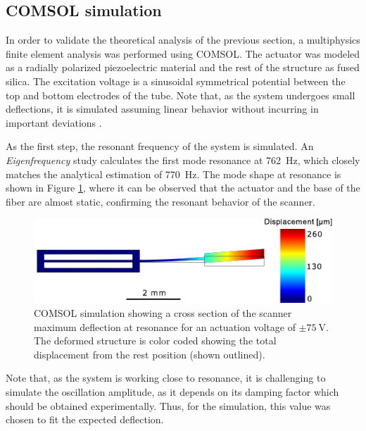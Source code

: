 \documentclass[10pt]{iopart}
\begin{document}
\subsection{COMSOL simulation}

In order to validate the theoretical analysis of the previous section, a multiphysics finite element analysis was performed using COMSOL. The actuator was modeled as a radially polarized piezoelectric material and the rest of the structure as fused silica. The excitation voltage is a sinusoidal symmetrical potential between the top and bottom electrodes of the tube. Note that, as the system undergoes small deflections, it is simulated assuming linear behavior without incurring in important deviations \cite{Fertis2006}.

As the first step, the resonant frequency of the system is simulated. An \textit{Eigenfrequency} study calculates the first mode resonance at \SI{762}{\hertz}, which closely matches the analytical estimation of \SI{770}{\hertz}. The mode shape at resonance is shown in Figure \ref{fig:defle}, where it can be observed that the actuator and the base of the fiber are almost static, confirming the resonant behavior of the scanner.

\begin{figure}[h!]\centering
      \includegraphics[width=\columnwidth]{figures/deflection.pdf}
      \caption{COMSOL simulation showing a cross section of the scanner maximum deflection at resonance for an actuation voltage of $\pm \SI{75}{\volt}$. The deformed structure is color coded showing the total displacement from the rest position (shown outlined). }
      \label{fig:defle}
\end{figure}

Note that, as the system is working close to resonance, it is challenging to simulate the oscillation amplitude, as it depends on its damping factor which should be obtained experimentally. Thus, for the simulation, this value was chosen to fit the expected deflection. 



\end{document}
